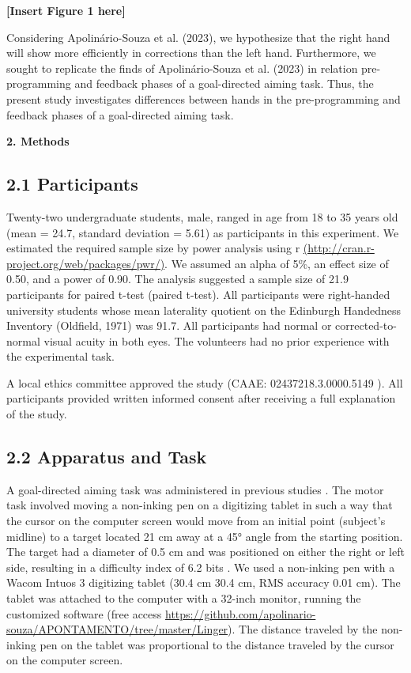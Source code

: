 \documentclass[man,a4paper,12pt,floatsintext]{apa6}
\begin{document}
\begin{center}
\textbf{[Insert Figure 1 here]}
\end{center}

Considering Apolinário-Souza et al. (2023), we hypothesize that the right hand will show more efficiently in corrections than the left hand. Furthermore, we sought to replicate the finds of Apolinário-Souza et al. (2023) in relation pre-programming and feedback phases of a goal-directed aiming task. Thus, the present study investigates differences between hands in the pre-programming and feedback phases of a goal-directed aiming task.




	

\begin{flushleft}
\textbf{2. Methods}
\end{flushleft}
\subsection{2.1 Participants}
Twenty-two undergraduate students, male, ranged in age from 18 to 35 years old (mean = 24.7, standard deviation = 5.61) as participants in this experiment. We estimated the required sample size by power analysis using r  \url{(http://cran.r-project.org/web/packages/pwr/)}. We assumed an alpha of 5\%, an effect size of 0.50, and a power of 0.90. The analysis suggested a sample size of 21.9 participants for paired t-test (paired t-test). All participants were right-handed university students whose mean laterality quotient on the Edinburgh Handedness Inventory (Oldfield, 1971) was 91.7. All participants had normal or corrected-to-normal visual acuity in both eyes. The volunteers had no prior experience with the experimental task.

A local ethics committee approved the study (CAAE: 02437218.3.0000.5149 ). All participants provided written informed consent after receiving a full explanation of the study. 
	
\subsection{2.2 Apparatus and Task}

A goal-directed aiming task was administered in previous studies \citep{Fernandes2018c,Fernandes2022a,Lage2012c,Lage2013b,Oliveira2019}. The motor task involved moving a non-inking pen on a digitizing tablet in such a way that the cursor on the computer screen would move from an initial point (subject's midline) to a target located 21 cm away at a 45° angle from the starting position. The target had a diameter of 0.5 cm and was positioned on either the right or left side, resulting in a difficulty index of 6.2 bits \citep{Fitts1958}. We used a non-inking pen with a Wacom Intuos 3 digitizing tablet (30.4 cm  30.4 cm, RMS accuracy 0.01 cm). The tablet was attached to the computer with a 32-inch monitor, running the customized software (free access \url{https://github.com/apolinario-souza/APONTAMENTO/tree/master/Linger}). The distance traveled by the non-inking pen on the tablet was proportional to the distance traveled by the cursor on the computer screen.
\end{document}
